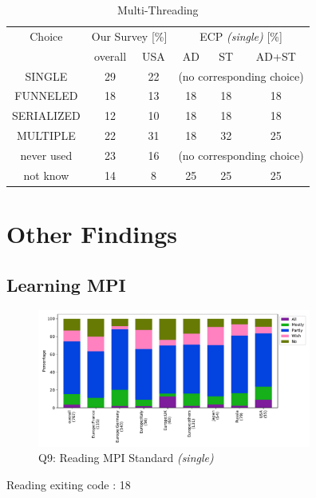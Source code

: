 \documentclass[conference,10pt,letterpaper]{IEEEtran}
\begin{document}
\begin{table}[htb]%
\begin{center}%
\caption{Multi-Threading}\label{tab:multi-thread}%
\begin{tabular}{c||c|c||c|c|c}%
\hline%
Choice & \multicolumn{2}{c||}{Our Survey [\%]} & 
\multicolumn{3}{c}{ECP {\it(single)} [\%]} \\
\cline{2-6}%
 & overall & USA & AD & ST & AD+ST \\
\hline%
SINGLE & 29 & 22 & \multicolumn{3}{c}{\tiny (no corresponding choice)} \\
FUNNELED & 18 & 13 & 18 & 18 & 18 \\
SERIALIZED & 12 & 10 & 18 & 18 & 18 \\
MULTIPLE & 22 & 31 & 18 & 32 & 25 \\
never used & 23 & 16 & \multicolumn{3}{c}{\tiny (no corresponding choice)} \\
not know & 14 & 8 & 25 & 25 & 25\\
\hline%
\end{tabular}%
\end{center}%
\end{table}%

\section{Other Findings}

\subsection{Learning MPI}

\begin{figure}[htb]
\begin{center}
\includegraphics[width=9cm]{Figs/Q9.pdf}
\caption{Q9: Reading MPI Standard {\it(single)}}
\label{fig:reading-standard}
\end{center}
\end{figure}

Reading exiting code : 18
\end{document}
